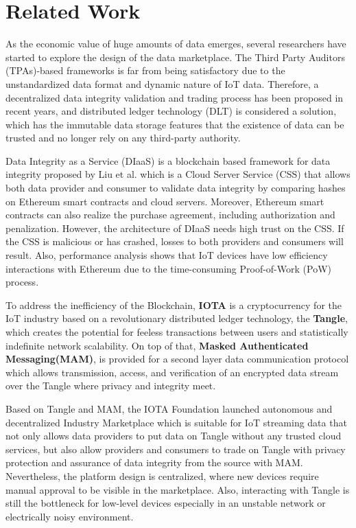 \documentclass[conference]{IEEEtran}
\begin{document}
\section{Related Work}
As the economic value of huge amounts of data emerges, several researchers have started to explore the design of the data marketplace. The Third Party Auditors (TPAs)-based frameworks\cite{TPA} is far from being satisfactory due to the unstandardized data format and dynamic nature of IoT data. Therefore, a decentralized data integrity validation and trading process has been proposed in recent years, and distributed ledger technology (DLT) is considered a solution, which has the immutable data storage features that the existence of data can be trusted and no longer rely on any third-party authority.

Data Integrity as a Service (DIaaS) is a blockchain based framework for data integrity proposed by Liu et al.\cite{DIaas} which is a Cloud Server Service (CSS) that allows both data provider and consumer to validate data integrity by comparing hashes on Ethereum smart contracts\cite{smartContract} and cloud servers. Moreover, Ethereum smart contracts can also realize the purchase agreement, including authorization and penalization. However, the architecture of DIaaS needs high trust on the CSS. If the CSS is malicious or has crashed, losses to both providers and consumers will result. Also, performance analysis shows that IoT devices have low efficiency interactions with Ethereum due to the time-consuming Proof-of-Work (PoW) process.

To address the inefficiency of the Blockchain, \textbf{IOTA}\cite{IOTAwhitepaper} is a cryptocurrency for the IoT industry based on a revolutionary distributed ledger technology, the \textbf{Tangle}, which creates the potential for feeless transactions between users and statistically indefinite network scalability. On top of that, \textbf{Masked Authenticated Messaging(MAM)}\cite{MAM, MAMSpec, MAMDescription}, is provided for a second layer data communication protocol which allows transmission, access, and verification of an encrypted data stream over the Tangle where privacy and integrity meet.

Based on Tangle and MAM, the IOTA Foundation launched autonomous and decentralized Industry Marketplace\cite{IOTAIdustryMarketplace} which is suitable for IoT streaming data that not only allows data providers to put data on Tangle without any trusted cloud services, but also allow providers and consumers to trade on Tangle with privacy protection and assurance of data integrity from the source with MAM. Nevertheless, the platform design is centralized, where new devices require manual approval to be visible in the marketplace. Also, interacting with Tangle is still the bottleneck for low-level devices especially in an unstable network or electrically noisy environment.
\end{document}
